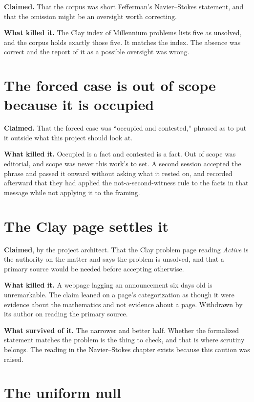 \textbf{Claimed.} That the corpus was short Fefferman's Navier--Stokes statement, and that the
omission might be an oversight worth correcting.

\textbf{What killed it.} The Clay index of Millennium problems lists five as unsolved, and the
corpus holds exactly those five. It matches the index. The absence was correct and the report of it
as a possible oversight was wrong.

\section{The forced case is out of scope because it is occupied}

\textbf{Claimed.} That the forced case was ``occupied and contested,'' phrased as to put it
outside what this project should look at.

\textbf{What killed it.} Occupied is a fact and contested is a fact. Out of scope was editorial, and
scope was never this work's to set. A second session accepted the phrase and passed it onward
without asking what it rested on, and recorded afterward that they had applied the
not-a-second-witness rule to the facts in that message while not applying it to the framing.

\section{The Clay page settles it}

\textbf{Claimed}, by the project architect. That the Clay problem page reading \emph{Active} is the
authority on the matter and says the problem is unsolved, and that a primary source would be needed
before accepting otherwise.

\textbf{What killed it.} A webpage lagging an announcement six days old is unremarkable. The claim
leaned on a page's categorization as though it were evidence about the mathematics and not
evidence about a page. Withdrawn by its author on reading the primary source.

\textbf{What survived of it.} The narrower and better half. Whether the formalized statement matches
the problem is the thing to check, and that is where scrutiny belongs. The reading in the
Navier--Stokes chapter exists because this caution was raised.

\section{The uniform null}

